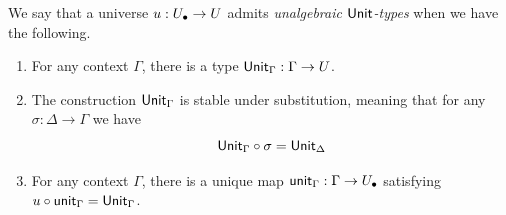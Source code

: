 \begin{definition} \label{def:elementary-unit}
  We say that a universe ${u} : {U_\bullet} \to U$ admits
  \emph{unalgebraic $\mathsf{Unit}$-types} when we have the following.
  \begin{enumerate}
  \item
    For any context $\Gamma$, there is a type $\mathsf{Unit}_\Gamma : \Gamma \to U$.
  \item
    The construction $\mathsf{Unit}_\Gamma$ is stable under substitution,
    meaning that for any $\sigma : \Delta \to \Gamma$ we have
    \[
      \mathsf{Unit}_\Gamma \circ \sigma = \mathsf{Unit}_\Delta
    \]
  \item
    For any context $\Gamma$, there is a unique map $\mathsf{unit}_\Gamma : \Gamma \to {U_\bullet}$
    satisfying ${u} \circ \mathsf{unit}_\Gamma = \mathsf{Unit}_\Gamma$.
  \end{enumerate}
\end{definition}

